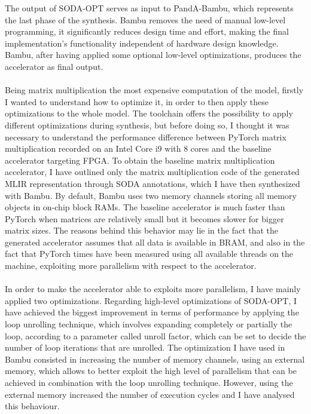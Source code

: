 \documentclass{article}
\begin{document}
The output of SODA-OPT serves as input to PandA-Bambu, which represents the last phase of the synthesis.
Bambu removes the need of manual low-level programming, it significantly reduces design time and effort, making the final implementation’s functionality independent of hardware design knowledge.
Bambu, after having applied some optional low-level optimizations, produces the accelerator as final output.
\\
\\
\noindent
Being matrix multiplication the most expensive computation of the model, firstly I wanted to understand how to optimize it, in order to then apply these optimizations to the whole model.
The toolchain offers the possibility to apply different optimizations during synthesis, but before doing so, I thought it was necessary to understand the performance difference between PyTorch matrix multiplication recorded on an Intel Core i9 with 8 cores and the baseline accelerator targeting FPGA.
To obtain the baseline matrix multiplication accelerator, I have outlined only the matrix multiplication code of the generated MLIR representation through SODA annotations, which I have then synthesized with Bambu.
By default, Bambu uses two memory channels storing all memory objects in on-chip block RAMs.
The baseline accelerator is much faster than PyTorch when matrices are relatively small but it becomes slower for bigger matrix sizes.
The reasons behind this behavior may lie in the fact that the generated accelerator assumes that all data is available in BRAM, and also in the fact that PyTorch times have been measured using all available threads on the machine, exploiting more parallelism with respect to the accelerator.
\\
\\
\noindent
In order to make the accelerator able to exploits more parallelism, I have mainly applied two optimizations.
Regarding high-level optimizations of SODA-OPT, I have achieved the biggest improvement in terms of performance by applying the loop unrolling technique, which involves expanding completely or partially the loop, according to a parameter called unroll factor, which can be set to decide the number of loop iterations that are unrolled.
The optimization I have used in Bambu consisted in increasing the number of memory channels, using an external memory, which allows to better exploit the high level of parallelism that can be achieved in combination with the loop unrolling technique.
However, using the external memory increased the number of execution cycles and I have analysed this behaviour.
\end{document}
